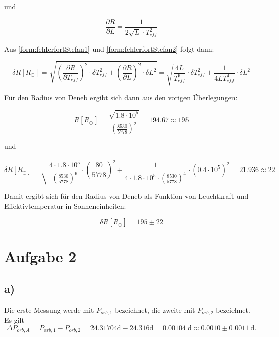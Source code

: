 \documentclass[titlepage]{scrartcl}
\begin{document}
und

\begin{equation}
\frac{\partial R}{\partial L} = \frac{1}{2 \sqrt{L} \cdot T^2_{eff}}
\label{form:fehlerfortStefan2}
\end{equation}

Aus \eqref{form:fehlerfortStefan1} und \eqref{form:fehlerfortStefan2} folgt dann:

\begin{equation}
\delta R[R_{\odot}] = \sqrt{(\frac{\partial R}{\partial T_{eff}})^2 \cdot \delta T^2_{eff} + (\frac{\partial R}{\partial L})^2 \cdot \delta L^2} = \sqrt{\frac{4 L}{T^6_{eff}} \cdot \delta T^2_{eff} + \frac{1}{4 L T^4_{eff}} \cdot \delta L^2}
\end{equation}

Für den Radius von Deneb ergibt sich dann aus den vorigen Überlegungen:

\begin{equation}
R[R_{\odot}] = \frac{\sqrt{1.8 \cdot 10^5}} {(\frac{8530}{5778})^2} = 194.67  \approx 195
\end{equation}

und

\begin{equation}
\delta R[R_{\odot}] = \sqrt{\frac{4 \cdot 1.8 \cdot 10^5}{({\frac{8530}{5778}})^6} \cdot (\frac{80}{5778})^2 + \frac{1}{4 \cdot 1.8 \cdot 10^5 \cdot ({\frac{8530}{5778}})^4} \cdot (0.4 \cdot 10^5)^2} = 21.936 \approx 22
\end{equation}

Damit ergibt sich für den Radius von Deneb als Funktion von Leuchtkraft und Effektivtemperatur in Sonneneinheiten:

\begin{equation}
\delta R[R_{\odot}] = 195 \pm 22
\end{equation}


\section{Aufgabe 2} 
\subsection{a)} 
Die erste Messung werde mit $P_{orb, 1}$ bezeichnet, die zweite mit $P_{orb,2}$ bezeichnet. 
Es gilt 
\begin{equation}
\Delta P_{orb,A} = P_{orb, 1} - P_{orb, 2} = 24.31704 \mathrm{d} - 24.316 \mathrm{d} =  0.00104 \ \mathrm{d} \approx 0.0010 \pm 0.0011\ \mathrm{d}.
\end{equation} 
\end{document}
